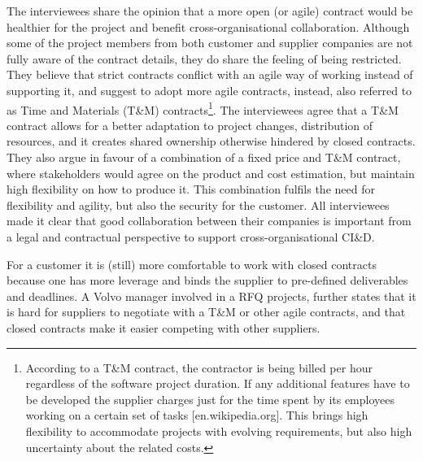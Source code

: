  The interviewees share the opinion that a more open (or agile) contract would be healthier for the project and benefit cross-organisational collaboration. Although some of the project members from both customer and supplier companies are not fully aware of the contract details, they do share the feeling of being restricted. They believe that strict contracts conflict with an agile way of working instead of supporting it, and suggest to adopt more agile contracts, instead, also referred to as Time and Materials (T\&M) contracts\footnote{According to a T\&M contract, the contractor is being billed per hour regardless of the software project duration. If any additional features have to be developed the supplier charges just for the time spent by its employees working on a certain set of tasks [en.wikipedia.org]. This brings high flexibility to accommodate projects with evolving requirements, but also high uncertainty about the related costs.}. 
The interviewees agree that a T\&M contract allows for a better adaptation to project changes, distribution of resources, and it creates shared ownership otherwise hindered by closed contracts. They also argue in favour of a combination of a fixed price and T\&M contract, where stakeholders would agree on the product and cost estimation, but maintain high flexibility on how to produce it. This combination fulfils the need for flexibility and agility, but also the security for the customer. All interviewees made it clear that good collaboration between their companies is important from a legal and contractual perspective to support cross-organisational CI\&D.

 For a customer it is (still) more comfortable to work with closed contracts because one has more leverage and binds the supplier to pre-defined deliverables and deadlines. A Volvo manager involved in a RFQ projects, further states that it is hard for suppliers to negotiate with a T\&M or other agile contracts, and that closed contracts make it easier competing with other suppliers.


